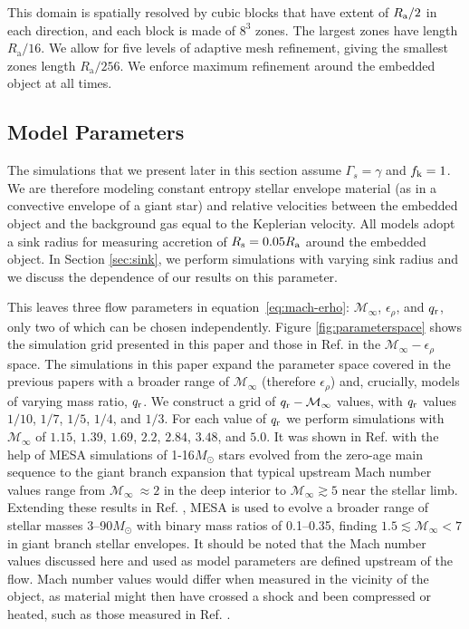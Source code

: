 This domain is spatially resolved by  cubic blocks that have extent of $R_{\rm a}/2$ in each direction, and each block is made of $8^3$ zones. The largest zones have length $R_{\mathrm{a}}/16$. We allow for five levels of adaptive mesh refinement, giving the smallest zones length $R_{\mathrm{a}}/256$. We enforce maximum refinement around the embedded object at all times.  


\subsection{Model Parameters}

The simulations that we present later in this section assume $\Gamma_s = \gamma$ and $f_{\rm k} = 1$. We are therefore modeling constant entropy stellar envelope material (as in a convective envelope of a giant star) and relative velocities between the embedded object and the background gas equal to the Keplerian velocity. All models adopt a sink radius for measuring accretion of $R_{\rm s} = 0.05R_{\mathrm{a}}$ around the embedded object. In Section \ref{sec:sink}, we perform simulations with varying sink radius and we discuss the dependence of our results on this parameter. 

This leaves three flow parameters in equation~\eqref{eq:mach-erho}: $\mathcal{M}_\infty$, $\epsilon_\rho$, and $q_{\rm r}$, only two of which can be chosen independently. Figure \ref{fig:parameterspace} shows the simulation grid presented in this paper and those in Ref. \cite{MacLeod:2014yda,MacLeod:2017} in the $\mathcal{M}_\infty - \epsilon_\rho$ space. The simulations in this paper expand the parameter space covered in the previous papers with a broader range of $\mathcal{M}_\infty$ (therefore $\epsilon_\rho$) and, crucially, models of varying mass ratio, $q_{\rm r}$. We construct a grid of $q_{\rm r} - \mathcal{M}_\infty$ values, with $q_{\rm r}$ values $1/10$, $1/7$, $1/5$, $1/4$, and $1/3$. For each value of $q_{\rm r}$ we perform simulations with $\mathcal{M}_\infty$ of $1.15$, $1.39$, $1.69$, $2.2$, $2.84$, $3.48$, and $5.0$. It was shown in Ref. \cite{MacLeod_2015} with the help of MESA simulations of 1-16$M_\odot$ stars evolved from the zero-age main sequence to the giant branch expansion that typical upstream Mach number values range from $\mathcal{M}_\infty~\approx 2$ in the deep interior to $\mathcal{M}_\infty \gtrsim 5$ near the stellar limb. Extending these results in Ref. \cite{Everson:2020eeq}, MESA is used to evolve a broader range of stellar masses 3--90$M_\odot$ with binary mass ratios of 0.1--0.35, finding $1.5 \lesssim \mathcal{M}_\infty < 7$ in giant branch stellar envelopes. It should be noted that the Mach number values discussed here and used as model parameters are defined upstream of the flow. Mach number values would differ when measured in the vicinity of the object, as material might then have crossed a shock and been compressed or heated, such as those measured in Ref. \cite{Iaconi:2018}.

